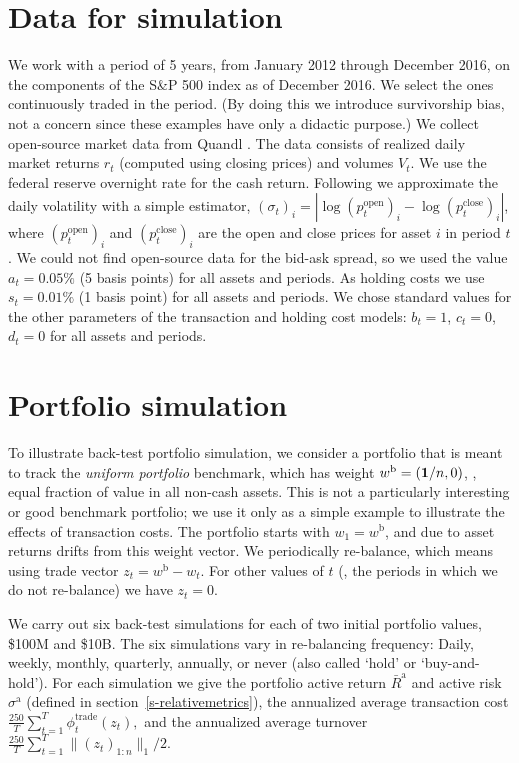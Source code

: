 \documentclass[openany]{now}
\newcommand{\wb}{w^\mathrm{b}}
\renewcommand{\S}{section~}
\begin{document}
\section{Data for simulation}
\label{s-example-data}
We work with a period of 5 years, from January 2012 through December 2016,
on the components of the S\&P 500 index
as of December 2016.
We select the ones continuously traded in the period.
(By doing this we introduce survivorship bias,
not a concern since these examples have only a didactic purpose.)
We collect open-source market data from
Quandl \cite{QuandlWIKI}.
The data consists of realized daily market returns $r_t$ (computed using
closing prices) and volumes $V_t$.
We use the federal reserve overnight rate for the cash return.
Following \cite{almgren09}
we approximate the daily volatility with a simple estimator,
$(\sigma_t)_i =
|\log (p_t^\text{open})_i -\log (p_t^\text{close})_i|$,
where $(p_t^\text{open})_i$ and
$(p_t^\text{close})_i$ are the open and close prices
for asset $i$ in period $t$.
We could not find open-source data for the bid-ask spread,
so we used the value $a_t = 0.05\%$ (5 basis points) for all
assets and periods.
As holding costs we use
$s_t = 0.01\%$ (1 basis point) for all assets and periods.
We chose standard values for the other parameters
of the transaction and holding
cost models: $b_t = 1$, $c_t = 0$, $d_t = 0$ for all assets and periods.

\section{Portfolio simulation}
To illustrate back-test portfolio simulation,
we consider a portfolio that is meant to track the \emph{uniform portfolio}
benchmark, which has weight $\wb = (\ones/n, 0)$,
\ie, equal fraction of value in all non-cash assets.
This is not a particularly interesting or good benchmark portfolio;
we use it only as a simple example to illustrate the effects
of transaction costs.
The portfolio starts with $w_1 = w^\mathrm{b}$, and due to asset returns
drifts from this weight vector.  We periodically re-balance, which means
using trade vector $z_t = w^\text{b} - w_t$. For other values of $t$
(\ie, the periods in which we do not re-balance) we have $z_t=0$.

We carry out six back-test simulations for each of two initial portfolio
values, \$100M and \$10B.
The six simulations vary in re-balancing frequency:
Daily, weekly, monthly, quarterly, annually, or never (also called `hold'
or `buy-and-hold').
For each simulation we give the portfolio active return $\bar R^\mathrm{a}$
and active risk $\sigma^\mathrm{a}$
(defined in \S\ref{s-relativemetrics}),
the annualized average transaction cost
$
\frac{250}{T}\sum_{t=1}^{T} \phi_t^\text{trade}(z_t),
$
and the annualized average turnover
$
\frac{250}{T}\sum_{t=1}^{T} \|(z_t)_{1:n}\|_1/2.
$
\end{document}
